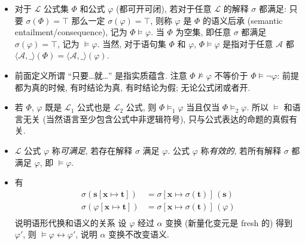 \documentclass[a4paper]{article}
\begin{document}
\begin{itemize}
    \item 对于 $\mathcal{L}$ 公式集 $\Phi$ 和公式 $\varphi$ (都可开可闭), 若对于任意 $\mathcal{L}$ 的解释 $\sigma$ 都满足: 只要 $\sigma(\Phi)=\top$ 那么一定 $\sigma(\varphi)=\top$,
        则称 $\varphi$ 是 $\Phi$ 的语义后承 (semantic entailment/consequence), 记为 $\Phi \models \varphi$.
        当 $\Phi$ 为空集, 即任意 $\sigma$ 都满足 $\sigma(\varphi)=\top$, 记为 $\models \varphi$.
        当然, 对于语句集 $\Phi$ 和 $\varphi$, $\Phi\models \varphi$ 是指对于任意 $\mathcal{A}$ 都 $\langle \mathcal{A}, \_\rangle(\Phi) = \langle \mathcal{A}, \_\rangle(\varphi)$.

    \item 前面定义所谓 ``只要\ldots 就\ldots'' 是指实质蕴含.
        注意 $\Phi\not\models \varphi$ 不等价于 $\Phi\models\lnot\varphi$: 前提都为真的时候, 有时结论为真, 有时结论为假; 无论公式闭或者开.

    \item 若 $\Phi$, $\varphi$ 既是 $\mathcal{L}_1$ 公式也是 $\mathcal{L}_2$ 公式, 则 $\Phi\models_1\varphi$ 当且仅当 $\Phi\models_2\varphi$.
        所以 $\models$ 和语言无关 (当然语言至少包含公式中非逻辑符号), 只与公式表达的命题的真假有关.

    \item $\mathcal{L}$ 公式 $\varphi$ 称\emph{可满足}, 若存在解释 $\sigma$ 满足 $\varphi$.
        公式 $\varphi$ 称\emph{有效的}, 若所有解释 $\sigma$ 都满足 $\varphi$, 即 $\models\varphi$.

    \item 有\begin{align*}
            \sigma(\mathbf{s} [\mathbf{x}\mapsto \mathbf{t}]) &= \sigma[\mathbf{x}\mapsto\sigma(\mathbf{t})]\, (\mathbf{s})\\
            \sigma(\varphi [\mathbf{x}\mapsto \mathbf{t}]) &= \sigma[\mathbf{x}\mapsto\sigma(\mathbf{t})]\, (\varphi)\\
        \end{align*}说明语形代换和语义的关系
        设 $\varphi$ 经过 $\alpha$ 变换 (新量化变元是 fresh 的) 得到 $\varphi'$, 则 $\models \varphi\leftrightarrow \varphi'$, 说明 $\alpha$ 变换不改变语义.
\end{itemize}
\end{document}
